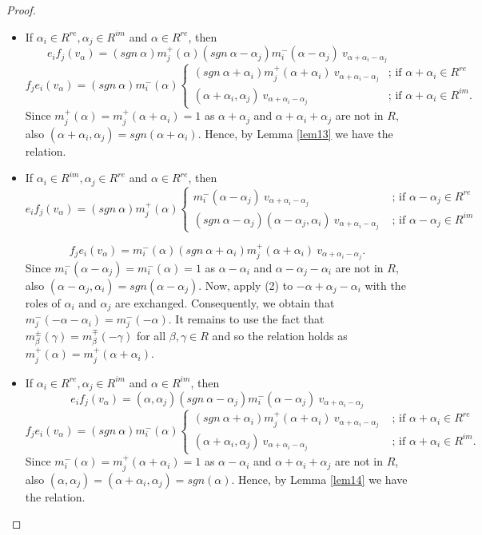 \documentclass[11pt]{amsart}
\theoremstyle{plain}
\theoremstyle{definition}
\numberwithin{equation}{section}
\newcommand{\al}{\alpha}
\newcommand{\be}{\beta}
\newcommand{\ga}{\gamma}
\begin{document}
\begin{proof}
\begin{itemize}
			\item[2.] If $\al_i\in R^{re}, \al_j\in R^{im}$ and $\al\in R^{re}$, then $$e_if_j(v_{\al})=(sgn~\al)m_j^+(\al)(sgn~\al-\al_j)m_i^-(\al-\al_j)~v_{\al+\al_i-\al_j}$$ $$f_je_i(v_{\al})=(sgn~\al)m_i^-(\al)\begin{cases}
			(sgn~\al+\al_i)m_j^+(\al+\al_i)~v_{\al+\al_i-\al_j}&\text{; if }	\al+\al_i\in R^{re}\\(\al+\al_i,\al_j)~v_{\al+\al_i-\al_j}&\text{; if }\al+\al_i\in R^{im}.
			\end{cases}$$
			Since $m_j^+(\al)=m_j^+(\al+\al_i)=1$ as $\al+\al_j$ and $\al+\al_i+\al_j$ are not in $R$, also $(\al+\al_i,\al_j)=sgn(\al+\al_i)$. Hence, by Lemma \ref{lem13} we have the relation. 
			\item[3.] If $\al_i\in R^{im},\al_j\in R^{re}$ and $\al\in R^{re}$, then 
			$$e_if_j(v_{\al})=(sgn~\al)m_j^+(\al)\begin{cases}
				m_i^-(\al-\al_j)~v_{\al+\al_i-\al_j}&\text{ ; if }\al-\al_j\in R^{re}\\(sgn~\al-\al_j)(\al-\al_j,\al_i)~v_{\al+\al_i-\al_j}&\text{ ; if }\al-\al_j\in R^{im}
			\end{cases}$$
			
			$$f_je_i(v_{\al})=m_i^-(\al)(sgn~\al+\al_i)m_j^+(\al+\al_i)~v_{\al+\al_i-\al_j}.$$
			Since $m_i^-(\al-\al_j)=m_i^-(\al)=1$ as $\al-\al_i$ and $\al-\al_j-\al_i$ are not in $R$, also $(\al-\al_j,\al_i)=sgn(\al-\al_j)$. Now, apply (2) to $-\al+\al_j-\al_i$ with the roles of $\al_i$ and $\al_j$ are exchanged. Consequently, we obtain that  $m_j^-(-\al-\al_i)=m_j^-(-\al)$. It remains to use the fact that $m_{\be}^{\pm}(\ga)=m_{\be}^{\mp}(-\ga)$ for all $\be,\ga\in R$ and so the relation holds as $m_j^+(\al)=m_j^+(\al+\al_i)$.
			
			\item[4.] If $\al_i\in R^{re},\al_j\in R^{im}$ and $\al\in R^{im}$, then 
		 $$e_if_j(v_{\al})=(\al,\al_j)(sgn~\al-\al_j)m_i^-(\al-\al_j)~v_{\al+\al_i-\al_j}$$ $$f_je_i(v_{\al})=(sgn~\al)m_i^-(\al)\begin{cases}
		 	(sgn~\al+\al_i)m_j^+(\al+\al_i)~v_{\al+\al_i-\al_j}&\text{ ; if }\al+\al_i\in R^{re}\\(\al+\al_i,\al_j)~v_{\al+\al_i-\al_j}&\text{ ; if }\al+\al_i\in R^{im}.
		 \end{cases}$$
		 Since $m_i^-(\al)=m_j^+(\al+\al_i)=1$ as $\al-\al_i$ and $\al+\al_i+\al_j$ are not in $R$, also $(\al,\al_j)=(\al+\al_i,\al_j)=sgn(\al)$. Hence, by Lemma \ref{lem14} we have the relation.
			

\end{itemize}
\end{proof}
\end{document}
